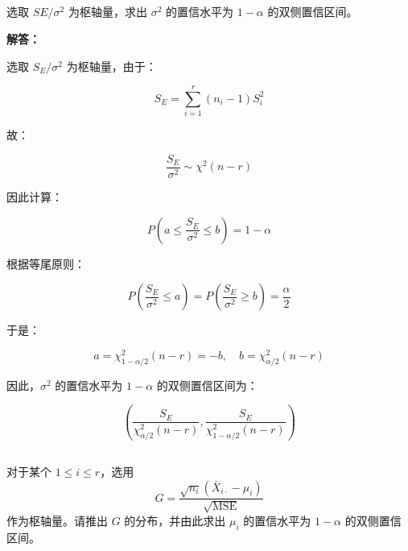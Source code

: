 \documentclass[12pt,a4paper]{article}
\begin{document}
\subsection{}

选取 $SE/\sigma^2$ 为枢轴量，求出 $\sigma^2$ 的置信水平为 $1-\alpha$ 的双侧置信区间。

\begin{answerbox}
\textbf{解答：}

选取 $S_E/\sigma^2$ 为枢轴量，由于：

$$
S_E = \sum_{i=1}^r (n_i-1) S_i^2
$$

故：

$$
\frac{S_E}{\sigma^2} \sim \chi^2(n-r)
$$

因此计算：

$$
P\left(a \leq \frac{S_E}{\sigma^2} \leq b\right) = 1-\alpha
$$

根据等尾原则：

$$
P\left(\frac{S_E}{\sigma^2} \leq a\right) = P\left(\frac{S_E}{\sigma^2} \geq b\right) = \frac{\alpha}{2}
$$

于是：

$$
a = \chi^2_{1-\alpha/2}(n-r) = -b, \quad b = \chi^2_{\alpha/2}(n-r)
$$

因此，$\sigma^2$ 的置信水平为 $1-\alpha$ 的双侧置信区间为：

$$
\left( \frac{S_E}{\chi^2_{\alpha/2}(n-r)}, \frac{S_E}{\chi^2_{1-\alpha/2}(n-r)} \right)
$$

\end{answerbox}

\subsection{}

对于某个 $1\le i\le r$，选用
  \[
  G=\frac{\sqrt{n_i}(\bar X_{i\cdot}-\mu_i)}{\sqrt{\mathrm{MSE}}}
  \]
  作为枢轴量。请推出 $G$ 的分布，并由此求出 $\mu_i$ 的置信水平为 $1-\alpha$ 的双侧置信区间。
\end{document}

